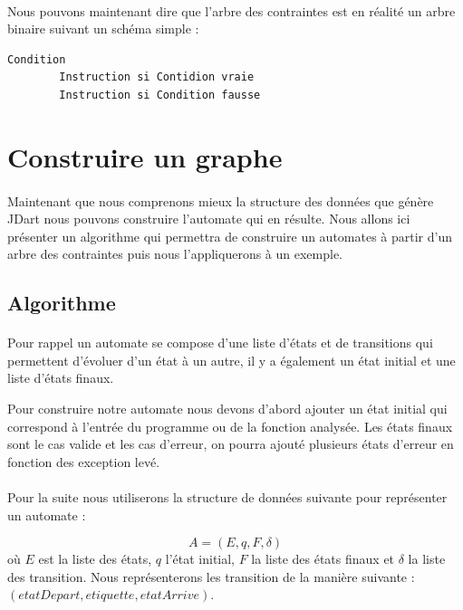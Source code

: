 \paragraph{}
Nous pouvons maintenant dire que l'arbre des contraintes est en réalité un 
arbre binaire suivant un schéma simple :
\begin{verbatim}
Condition
        Instruction si Contidion vraie
        Instruction si Condition fausse
\end{verbatim}



\section{Construire un graphe}

\paragraph{}
Maintenant que nous comprenons mieux la structure des données que génère JDart 
nous pouvons construire l'automate qui en résulte. Nous allons ici présenter un 
algorithme qui permettra de construire un automates à partir d'un arbre des 
contraintes puis nous l'appliquerons à un exemple.

\subsection{Algorithme}

\paragraph{}
Pour rappel un automate se compose d'une liste d'états et de transitions qui 
permettent d'évoluer d'un état à un autre, il y a également un état initial 
et une liste d'états finaux.


Pour construire notre automate nous devons d'abord ajouter un état initial qui 
correspond à l'entrée du programme ou de la fonction analysée. Les états finaux 
sont le cas valide et les cas d'erreur, on pourra ajouté plusieurs états 
d'erreur en fonction des exception levé.

\paragraph{}
Pour la suite nous utiliserons la structure de données suivante pour 
représenter un automate :

$$A = ( E, q, F, \delta )$$
où $E$ est la liste des états, $q$ l'état initial, $F$ la liste des états 
finaux 
et $\delta$ la liste des transition. Nous représenterons les transition de la 
manière suivante : $(etatDepart, etiquette, etatArrive)$.

